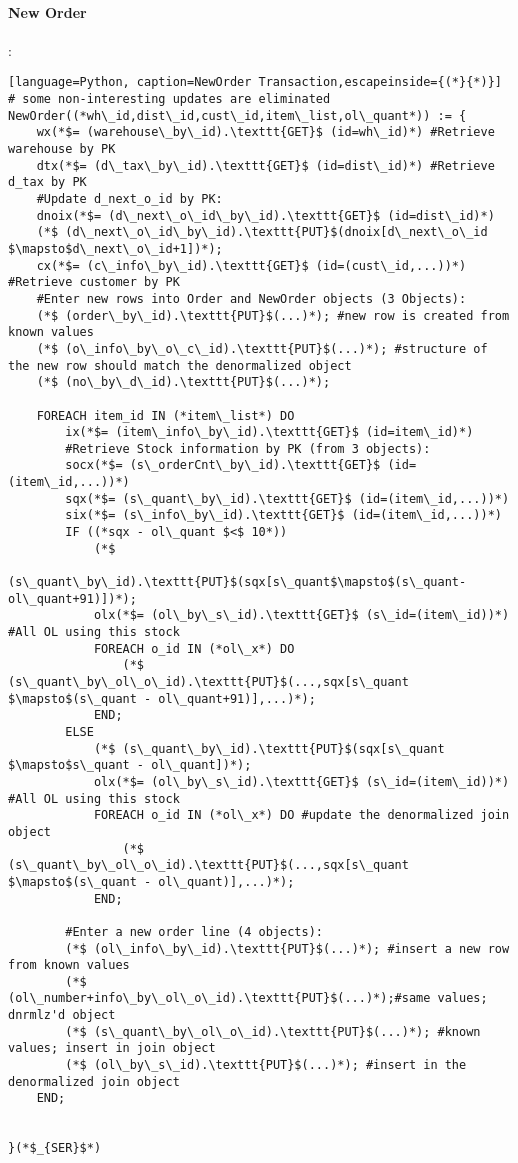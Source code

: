 \documentclass[12pt,letter]{article}
\begin{document}
\paragraph{New Order}:
\begin{lstlisting}[language=Python, caption=NewOrder Transaction,escapeinside={(*}{*)}]
# some non-interesting updates are eliminated
NewOrder((*wh\_id,dist\_id,cust\_id,item\_list,ol\_quant*)) := {	
	wx(*$= (warehouse\_by\_id).\texttt{GET}$ (id=wh\_id)*) #Retrieve warehouse by PK
	dtx(*$= (d\_tax\_by\_id).\texttt{GET}$ (id=dist\_id)*) #Retrieve d_tax by PK
	#Update d_next_o_id by PK:
	dnoix(*$= (d\_next\_o\_id\_by\_id).\texttt{GET}$ (id=dist\_id)*) 
	(*$ (d\_next\_o\_id\_by\_id).\texttt{PUT}$(dnoix[d\_next\_o\_id $\mapsto$d\_next\_o\_id+1])*);
	cx(*$= (c\_info\_by\_id).\texttt{GET}$ (id=(cust\_id,...))*) #Retrieve customer by PK
	#Enter new rows into Order and NewOrder objects (3 Objects):
	(*$ (order\_by\_id).\texttt{PUT}$(...)*); #new row is created from known values
	(*$ (o\_info\_by\_o\_c\_id).\texttt{PUT}$(...)*); #structure of the new row should match the denormalized object
	(*$ (no\_by\_d\_id).\texttt{PUT}$(...)*);
	
	FOREACH item_id IN (*item\_list*) DO
		ix(*$= (item\_info\_by\_id).\texttt{GET}$ (id=item\_id)*)
		#Retrieve Stock information by PK (from 3 objects):
		socx(*$= (s\_orderCnt\_by\_id).\texttt{GET}$ (id=(item\_id,...))*)
		sqx(*$= (s\_quant\_by\_id).\texttt{GET}$ (id=(item\_id,...))*)
		six(*$= (s\_info\_by\_id).\texttt{GET}$ (id=(item\_id,...))*)
		IF ((*sqx - ol\_quant $<$ 10*))
			(*$
			(s\_quant\_by\_id).\texttt{PUT}$(sqx[s\_quant$\mapsto$(s\_quant-ol\_quant+91)])*);		
			olx(*$= (ol\_by\_s\_id).\texttt{GET}$ (s\_id=(item\_id))*) #All OL using this stock
			FOREACH o_id IN (*ol\_x*) DO
				(*$ (s\_quant\_by\_ol\_o\_id).\texttt{PUT}$(...,sqx[s\_quant $\mapsto$(s\_quant - ol\_quant+91)],...)*);
			END;
		ELSE
			(*$ (s\_quant\_by\_id).\texttt{PUT}$(sqx[s\_quant $\mapsto$s\_quant - ol\_quant])*);		
			olx(*$= (ol\_by\_s\_id).\texttt{GET}$ (s\_id=(item\_id))*) #All OL using this stock
			FOREACH o_id IN (*ol\_x*) DO #update the denormalized join object
				(*$ (s\_quant\_by\_ol\_o\_id).\texttt{PUT}$(...,sqx[s\_quant $\mapsto$(s\_quant - ol\_quant)],...)*);
			END;
	
		#Enter a new order line (4 objects):
		(*$ (ol\_info\_by\_id).\texttt{PUT}$(...)*); #insert a new row from known values
		(*$ (ol\_number+info\_by\_ol\_o\_id).\texttt{PUT}$(...)*);#same values; dnrmlz'd object
		(*$ (s\_quant\_by\_ol\_o\_id).\texttt{PUT}$(...)*); #known values; insert in join object
		(*$ (ol\_by\_s\_id).\texttt{PUT}$(...)*); #insert in the denormalized join object
	END;
	

}(*$_{SER}$*)
\end{lstlisting}
\end{document}
